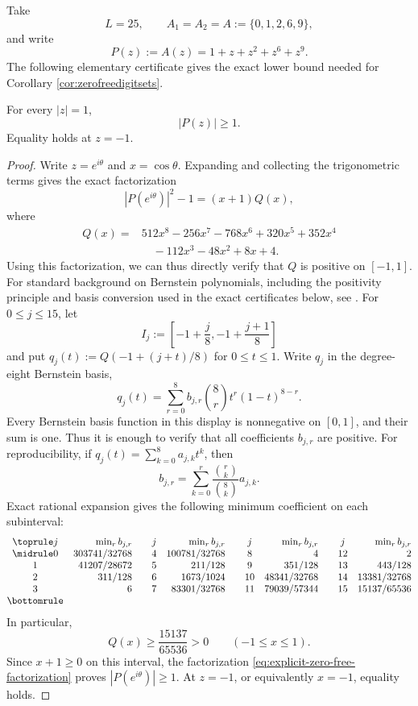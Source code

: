 \documentclass[12pt]{amsart}
\numberwithin{equation}{section}
\begin{document}
Take
\[
 L=25,
 \qquad
 A_1=A_2=A:=\{0,1,2,6,9\},
\]
and write
\[
 P(z):=A(z)=1+z+z^2+z^6+z^9.
\]
The following elementary certificate gives the exact lower bound needed for
Corollary \ref{cor:zerofreedigitsets}.

\medskip
\begin{lemma}\label{lma:explicitzerofreedigitset}
For every $|z|=1$,
\[
 |P(z)|\geq1.
\]
Equality holds at $z=-1$.
\end{lemma}

\begin{proof}
Write $z=e^{i\theta}$ and $x=\cos\theta$.  Expanding and collecting the
trigonometric terms gives the exact factorization
\begin{equation}\label{eq:explicit-zero-free-factorization}
 |P(e^{i\theta})|^2-1=(x+1)Q(x),
\end{equation}
where
\[
\begin{aligned}
 Q(x)={}&512x^8-256x^7-768x^6+320x^5+352x^4\\
 &\quad-112x^3-48x^2+8x+4.
\end{aligned}
\]
Using this factorization, we can thus directly verify that $Q$ is positive on $[-1,1]$.  For standard background on Bernstein polynomials, including the positivity principle and basis conversion used in the exact certificates below, see \cite{Lorentz}.
For $0\leq j\leq15$, let
\[
 I_j:=\left[-1+\frac j8,-1+\frac{j+1}{8}\right]
\]
and put $q_j(t):=Q(-1+(j+t)/8)$ for $0\leq t\leq1$.  Write $q_j$ in the
degree-eight Bernstein basis,
\[
 q_j(t)=\sum_{r=0}^8b_{j,r}
 \binom8r t^r(1-t)^{8-r}.
\]
Every Bernstein basis function in this display is nonnegative on $[0,1]$,
and their sum is one.  Thus it is enough to verify that all coefficients
$b_{j,r}$ are positive.  For reproducibility, if
$q_j(t)=\sum_{k=0}^8a_{j,k}t^k$, then
\[
 b_{j,r}
 =\sum_{k=0}^r
 \frac{\binom rk}{\binom8k}a_{j,k}.
\]
Exact rational expansion gives the following minimum coefficient on each
subinterval:
\[
\begin{array}{@{}cr@{\qquad}cr@{\qquad}cr@{\qquad}cr@{}}
\toprule
 j&\min_r b_{j,r}&j&\min_r b_{j,r}&j&\min_r b_{j,r}&j&\min_r b_{j,r}\\
\midrule
0&303741/32768&4&100781/32768&8&4&12&2\\
1&41207/28672&5&211/128&9&351/128&13&443/128\\
2&311/128&6&1673/1024&10&48341/32768&14&13381/32768\\
3&6&7&83301/32768&11&79039/57344&15&15137/65536
\\
\bottomrule
\end{array}
\]
In particular,
\[
 Q(x)\geq\frac{15137}{65536}>0
 \qquad(-1\leq x\leq1).
\]
Since $x+1\geq0$ on this interval, the factorization
\eqref{eq:explicit-zero-free-factorization} proves $|P(e^{i\theta})|\geq1$.
At $z=-1$, or equivalently $x=-1$, equality holds.
\end{proof}
\end{document}
